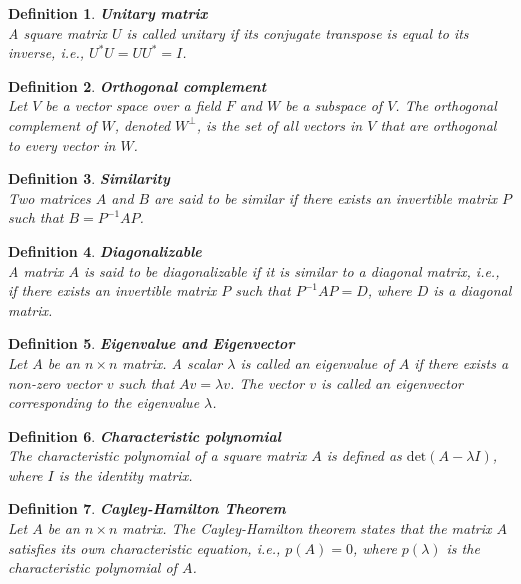 \documentclass[11pt]{book} %
\newtheorem{definition}{Definition}[section]
\begin{document}
\begin{definition}{\textbf{Unitary matrix}} \\
    A square matrix \( U \) is called unitary if its conjugate transpose is equal to its inverse, i.e., \( U^* U = U U^* = I \).
\end{definition}

\begin{definition}{\textbf{Orthogonal complement}} \\
    Let \( V \) be a vector space over a field \( F \) and \( W \) be a subspace of \( V \). The orthogonal complement of \( W \), denoted \( W^\perp \), 
    is the set of all vectors in \( V \) that are orthogonal to every vector in \( W \).
\end{definition}

\begin{definition}{\textbf{Similarity}} \\
    Two matrices \( A \) and \( B \) are said to be similar if there exists an invertible matrix \( P \) such that \( B = P^{-1} A P \).
\end{definition}

\begin{definition}{\textbf{Diagonalizable}} \\
    A matrix \( A \) is said to be diagonalizable if it is similar to a diagonal matrix, i.e., 
    if there exists an invertible matrix \( P \) such that \( P^{-1} A P = D \), where \( D \) is a diagonal matrix.
\end{definition}

\begin{definition}{\textbf{Eigenvalue and Eigenvector}} \\
    Let \( A \) be an \( n \times n \) matrix. A scalar \( \lambda \) is called an eigenvalue of \( A \) if there exists a non-zero vector \( v \) such that \( A v = \lambda v \). 
    The vector \( v \) is called an eigenvector corresponding to the eigenvalue \( \lambda \).
\end{definition}

\begin{definition}{\textbf{Characteristic polynomial}} \\
    The characteristic polynomial of a square matrix \( A \) is defined as \( \text{det}(A - \lambda I) \), where \( I \) is the identity matrix.
\end{definition}

\begin{definition}{\textbf{Cayley-Hamilton Theorem}} \\
    Let \( A \) be an \( n \times n \) matrix. The Cayley-Hamilton theorem states that the matrix \( A \) satisfies its own characteristic equation, i.e., 
    \( p(A) = 0 \), where \( p(\lambda) \) is the characteristic polynomial of \( A \).
\end{definition}
\end{document}

